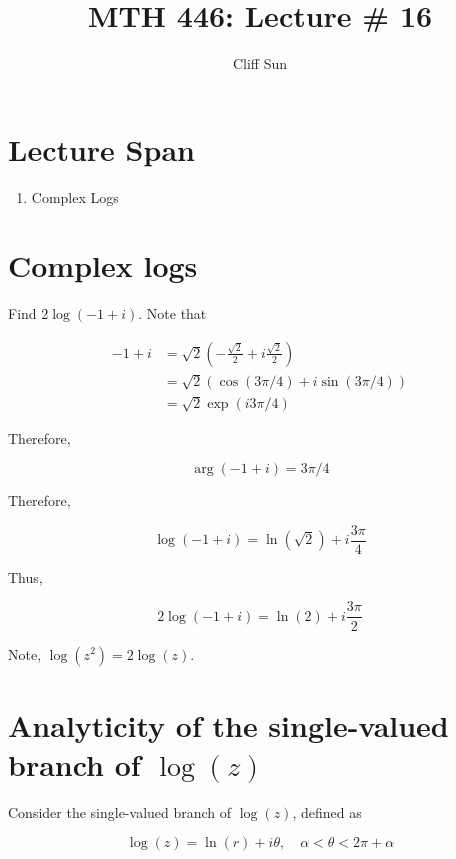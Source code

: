 \documentclass{article}
\title{MTH 446: Lecture \# 16}
\author{Cliff Sun}
\newtheorem{one minute paper}[theorem]{One Minute Paper}
\begin{document}
\maketitle

\section*{Lecture Span}
\begin{enumerate}
    \item Complex Logs
\end{enumerate}

\section*{Complex logs}

Find $2\log(-1 + i)$. Note that 

\begin{align}
    -1 + i &= \sqrt{2}\left( -\frac{\sqrt{2}}{2} + i\frac{\sqrt{2}}{2} \right) \\
    &= \sqrt{2}\left( \cos(3\pi/4) + i\sin(3\pi/4) \right) \\
    &= \sqrt{2}\exp(i3\pi/4)
\end{align}

Therefore, 

\begin{equation}
    \arg(-1 + i) = 3\pi/4
\end{equation}

Therefore,

\begin{equation}
    \log(-1 + i) = \ln(\sqrt{2}) + i\frac{3\pi}{4}
\end{equation}

Thus, 

\begin{equation}
    2\log(-1 + i) = \ln(2) + i\frac{3\pi}{2}
\end{equation}

Note, $\log(z^2) = 2\log(z)$. 

\section*{Analyticity of the single-valued branch of $\log(z)$}

Consider the single-valued branch of $\log(z)$, defined as 

\begin{equation}
    \log(z) = \ln(r) + i\theta, \quad \alpha < \theta < 2\pi + \alpha
\end{equation}
\end{document}
